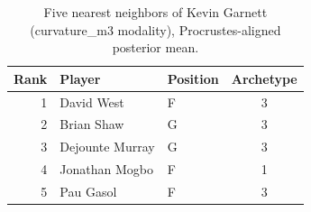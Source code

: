 \begin{table}[htbp]
  \centering\small
  \begin{tabular}{rllc}
    \toprule
    Rank & Player & Position & Archetype \\
    \midrule
    1 & David West & F & 3 \\
    2 & Brian Shaw & G & 3 \\
    3 & Dejounte Murray & G & 3 \\
    4 & Jonathan Mogbo & F & 1 \\
    5 & Pau Gasol & F & 3 \\
    \bottomrule
  \end{tabular}
  \caption{Five nearest neighbors of Kevin Garnett (curvature_m3 modality), Procrustes-aligned posterior mean.}
  \label{tab:Kevin_Garnett_neighbors_curvature_m3}
\end{table}

